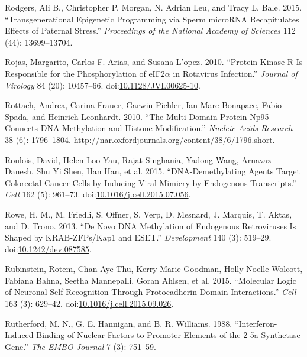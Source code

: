 \documentclass[onehalf,12pt]{beavtex}
\begin{document}
  \hypertarget{ref-RodgersTransgenerationalepigeneticprogramming2015}{}
  Rodgers, Ali B., Christopher P. Morgan, N. Adrian Leu, and Tracy L.
  Bale. 2015. ``Transgenerational Epigenetic Programming via Sperm
  microRNA Recapitulates Effects of Paternal Stress.'' \emph{Proceedings
  of the National Academy of Sciences} 112 (44): 13699--13704.
  
  \hypertarget{ref-RojasProteinKinaseResponsible2010}{}
  Rojas, Margarito, Carlos F. Arias, and Susana L\a'opez. 2010. ``Protein
  Kinase R Is Responsible for the Phosphorylation of eIF2\(\alpha\) in
  Rotavirus Infection.'' \emph{Journal of Virology} 84 (20): 10457--66.
  doi:\href{https://doi.org/10.1128/JVI.00625-10}{10.1128/JVI.00625-10}.
  
  \hypertarget{ref-RottachmultidomainproteinNp952010}{}
  Rottach, Andrea, Carina Frauer, Garwin Pichler, Ian Marc Bonapace, Fabio
  Spada, and Heinrich Leonhardt. 2010. ``The Multi-Domain Protein Np95
  Connects DNA Methylation and Histone Modification.'' \emph{Nucleic Acids
  Research} 38 (6): 1796--1804.
  \url{http://nar.oxfordjournals.org/content/38/6/1796.short}.
  
  \hypertarget{ref-RouloisDNADemethylatingAgentsTarget2015a}{}
  Roulois, David, Helen Loo Yau, Rajat Singhania, Yadong Wang, Arnavaz
  Danesh, Shu Yi Shen, Han Han, et al. 2015. ``DNA-Demethylating Agents
  Target Colorectal Cancer Cells by Inducing Viral Mimicry by Endogenous
  Transcripts.'' \emph{Cell} 162 (5): 961--73.
  doi:\href{https://doi.org/10.1016/j.cell.2015.07.056}{10.1016/j.cell.2015.07.056}.
  
  \hypertarget{ref-RowenovoDNAmethylation2013}{}
  Rowe, H. M., M. Friedli, S. Offner, S. Verp, D. Mesnard, J. Marquis, T.
  Aktas, and D. Trono. 2013. ``De Novo DNA Methylation of Endogenous
  Retroviruses Is Shaped by KRAB-ZFPs/Kap1 and ESET.'' \emph{Development}
  140 (3): 519--29.
  doi:\href{https://doi.org/10.1242/dev.087585}{10.1242/dev.087585}.
  
  \hypertarget{ref-RubinsteinMolecularLogicNeuronal2015}{}
  Rubinstein, Rotem, Chan Aye Thu, Kerry Marie Goodman, Holly Noelle
  Wolcott, Fabiana Bahna, Seetha Mannepalli, Goran Ahlsen, et al. 2015.
  ``Molecular Logic of Neuronal Self-Recognition Through Protocadherin
  Domain Interactions.'' \emph{Cell} 163 (3): 629--42.
  doi:\href{https://doi.org/10.1016/j.cell.2015.09.026}{10.1016/j.cell.2015.09.026}.
  
  \hypertarget{ref-RutherfordInterferoninducedbinding1988}{}
  Rutherford, M. N., G. E. Hannigan, and B. R. Williams. 1988.
  ``Interferon-Induced Binding of Nuclear Factors to Promoter Elements of
  the 2-5a Synthetase Gene.'' \emph{The EMBO Journal} 7 (3): 751--59.
  
\end{document}
